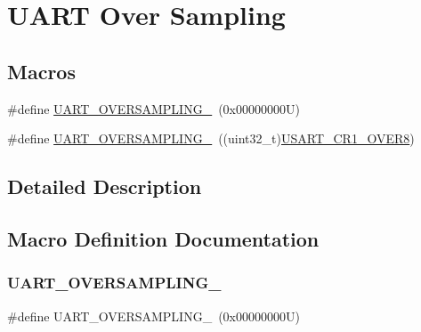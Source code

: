 \hypertarget{group___u_a_r_t___over___sampling}{}\section{U\+A\+RT Over Sampling}
\label{group___u_a_r_t___over___sampling}
\subsection*{Macros}
\begin{DoxyCompactItemize}
\item 
\#define \hyperlink{group___u_a_r_t___over___sampling_gaa6a320ec65d248d76f21de818db1a2f0}{U\+A\+R\+T\+\_\+\+O\+V\+E\+R\+S\+A\+M\+P\+L\+I\+N\+G\+\_}~(0x00000000\+U)
\item 
\#define \hyperlink{group___u_a_r_t___over___sampling_gaeb13896e8bdc1bb041e01a86a868ee0b}{U\+A\+R\+T\+\_\+\+O\+V\+E\+R\+S\+A\+M\+P\+L\+I\+N\+G\+\_}~((uint32\+\_\+t)\hyperlink{group___peripheral___registers___bits___definition_gaed6caeb0cb48f1a7b34090f31a92a8e2}{U\+S\+A\+R\+T\+\_\+\+C\+R1\+\_\+\+O\+V\+E\+R8})
\end{DoxyCompactItemize}


\subsection{Detailed Description}


\subsection{Macro Definition Documentation}
\mbox{\label{group___u_a_r_t___over___sampling_gaa6a320ec65d248d76f21de818db1a2f0}} 
\subsubsection{\texorpdfstring{U\+A\+R\+T\+\_\+\+O\+V\+E\+R\+S\+A\+M\+P\+L\+I\+N\+G\+\_}{UART\_OVERSAMPLING\_16}}
{\footnotesize\ttfamily \#define U\+A\+R\+T\+\_\+\+O\+V\+E\+R\+S\+A\+M\+P\+L\+I\+N\+G\+\_~(0x00000000\+U)}

